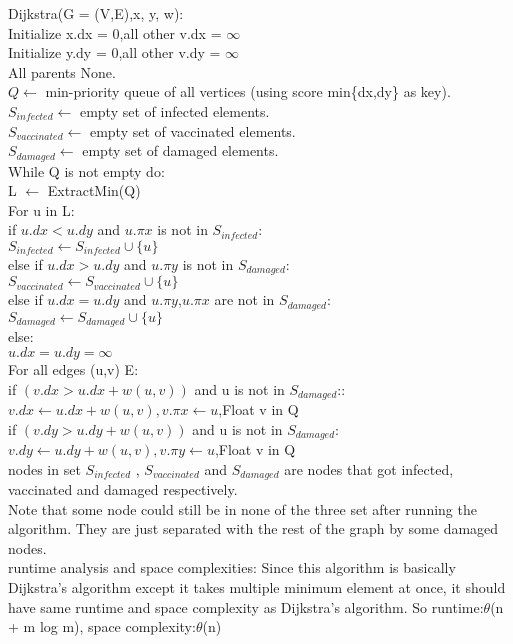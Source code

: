 \documentclass[12pt]{article}
\begin{document}
Dijkstra(G = (V,E),x, y, w):\\
Initialize x.dx = 0,all other v.dx = $\infty$\\
Initialize y.dy = 0,all other v.dy = $\infty$\\
All parents None.\\
$Q \leftarrow$ min-priority queue of all vertices (using score min\{dx,dy\} as key).\\
$S_{infected} \leftarrow$  empty set of infected elements.\\
$S_{vaccinated} \leftarrow$  empty set of vaccinated elements.\\
$S_{damaged} \leftarrow$  empty set of damaged elements.\\
While Q is not empty do:\\
\phantom{1234}L $\leftarrow$ ExtractMin(Q) \\
\phantom{1234}For u in L:\\
\phantom{1234}\phantom{1234} if $u.dx < u.dy$ and $u.\pi x$ is not in $S_{infected} $:\\
\phantom{1234}\phantom{12345678}$S_{infected}   \leftarrow S_{infected}   \cup \{u\}$\\
\phantom{1234}\phantom{1234}else if $u.dx >u.dy$ and $u.\pi y$ is not in $S_{damaged} $:\\
\phantom{1234}\phantom{12345678}$S_{vaccinated}   \leftarrow S_{vaccinated}   \cup \{u\}$\\
\phantom{1234}\phantom{1234}else if $u.dx = u.dy$ and $u.\pi y$,$u.\pi x$ are not in $S_{damaged} $:\\
\phantom{1234}\phantom{12345678}$S_{damaged}   \leftarrow S_{damaged}   \cup \{u\}$\\
\phantom{1234}\phantom{1234}else:\\
\phantom{1234}\phantom{12345678}$u.dx = u.dy = \infty$\\
\phantom{1234}\phantom{1234}For all edges (u,v)  E:\\
\phantom{1234}\phantom{12345678}if $ (v .dx > u.dx + w (u, v ))$ and u is not in $S_{damaged} $:: \\
\phantom{1234}\phantom{1234567890ab}$v .dx \leftarrow u.dx + w (u, v ) , v.\pi x \leftarrow u$,Float v in Q\\
\phantom{1234}\phantom{12345678}if $ (v .dy > u.dy + w (u, v ))$ and u is not in $S_{damaged} $: \\
\phantom{1234}\phantom{1234567890ab}$v .dy \leftarrow u.dy + w (u, v ), v.\pi y \leftarrow u $,Float v in Q\\

nodes in set 
$S_{infected} $ ,
$S_{vaccinated} $  and $S_{damaged} $  
are nodes that got infected, vaccinated and damaged respectively.\\


Note that some node could still be in none of the three set after running the algorithm. They are just separated with the rest of the graph by some damaged nodes.\\

runtime analysis and space complexities: Since this algorithm is basically  Dijkstra's  algorithm except it takes multiple minimum element at once, it should have same runtime and space complexity as  Dijkstra's  algorithm. So runtime:$\theta$(n + m log m), space complexity:$\theta$(n)
\end{document}
